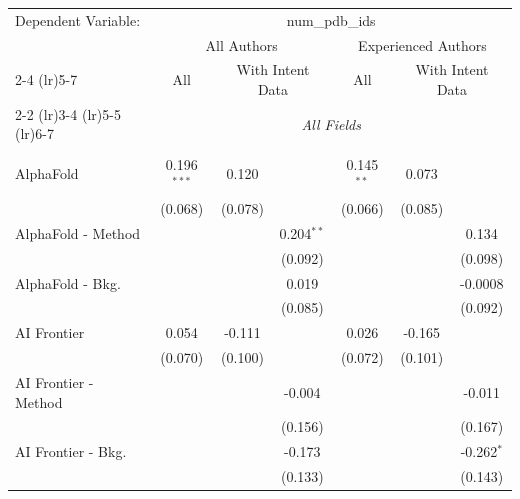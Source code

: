 \begingroup
\centering
\begin{tabular}{lcccccc}
   \tabularnewline \midrule \midrule
   Dependent Variable: & \multicolumn{6}{c}{num\_pdb\_ids}\\
 & \multicolumn{3}{c}{All Authors} & \multicolumn{3}{c}{Experienced Authors} \\
\cmidrule(lr){2-4} \cmidrule(lr){5-7}
 & \multicolumn{1}{c}{All} & \multicolumn{2}{c}{With Intent Data} & \multicolumn{1}{c}{All} & \multicolumn{2}{c}{With Intent Data} \\
\cmidrule(lr){2-2} \cmidrule(lr){3-4} \cmidrule(lr){5-5} \cmidrule(lr){6-7}
 & \multicolumn{6}{c}{\textit{All Fields}} \\ \\
   AlphaFold            & 0.196$^{***}$ & 0.120          &                & 0.145$^{**}$  & 0.073          &   \\   
                        & (0.068)       & (0.078)        &                & (0.066)       & (0.085)        &   \\   
   AlphaFold - Method   &               &                & 0.204$^{**}$   &               &                & 0.134\\   
                        &               &                & (0.092)        &               &                & (0.098)\\   
   AlphaFold - Bkg.     &               &                & 0.019          &               &                & -0.0008\\   
                        &               &                & (0.085)        &               &                & (0.092)\\   
   AI Frontier          & 0.054         & -0.111         &                & 0.026         & -0.165         &   \\   
                        & (0.070)       & (0.100)        &                & (0.072)       & (0.101)        &   \\   
   AI Frontier - Method &               &                & -0.004         &               &                & -0.011\\   
                        &               &                & (0.156)        &               &                & (0.167)\\   
   AI Frontier - Bkg.   &               &                & -0.173         &               &                & -0.262$^{*}$\\   
                        &               &                & (0.133)        &               &                & (0.143)\\   

\end{tabular}
